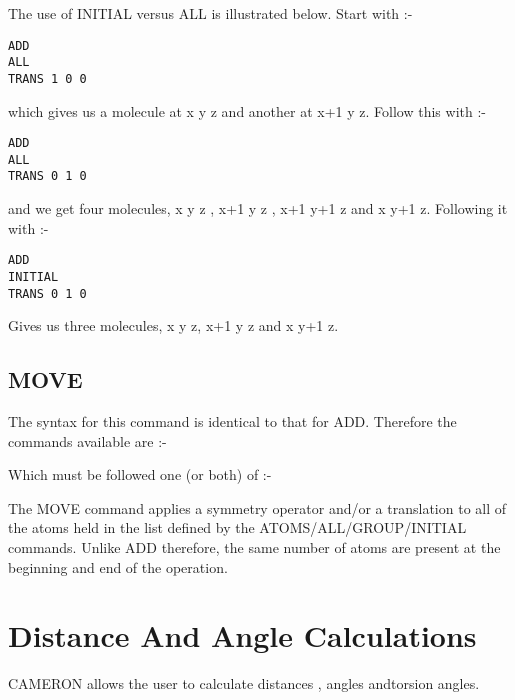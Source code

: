\documentclass[10pt,a4paper]{report}
\begin{document}
The use of INITIAL versus ALL is illustrated  below. Start with
:-
\small\begin{verbatim}
ADD
ALL
TRANS 1 0 0
\end{verbatim}\normalsize


which gives us a molecule at x y z and another at x+1 y z.
Follow this with :-
\small\begin{verbatim}
ADD
ALL
TRANS 0 1 0
\end{verbatim}\normalsize


and we get four molecules, x y z , x+1 y z , x+1 y+1 z and x y+1
z.
Following it with :-
\small\begin{verbatim}
ADD
INITIAL
TRANS 0 1 0
\end{verbatim}\normalsize


Gives us three molecules, x y z, x+1 y z and x y+1 z.



\section{MOVE}


The syntax for this command is identical to that for ADD.
Therefore
the commands available are :-


\bigskip{}




\bigskip{}




\bigskip{}




\bigskip{}


Which must be followed one (or both) of :-


\bigskip{}


\bigskip{}


The MOVE command applies a symmetry operator and/or a
translation to
all of the atoms held in the list defined by the
ATOMS/ALL/GROUP/INITIAL
commands. Unlike ADD therefore, the same number of atoms are
present at
the beginning and end of the operation.



\chapter{Distance And Angle Calculations}

CAMERON allows the user to calculate distances , angles andtorsion angles.
\end{document}
